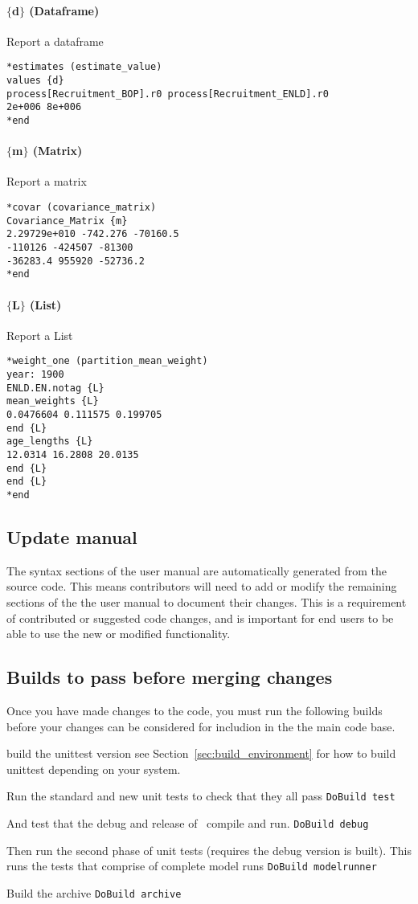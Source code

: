 \paragraph*{$\{$d$\}$ (Dataframe)}
Report a dataframe
{\small{\begin{verbatim}
*estimates (estimate_value)
values {d}
process[Recruitment_BOP].r0 process[Recruitment_ENLD].r0 
2e+006 8e+006
*end
\end{verbatim}}}

\paragraph*{$\{$m$\}$ (Matrix)}
Report a matrix
{\small{\begin{verbatim}
*covar (covariance_matrix)
Covariance_Matrix {m}
2.29729e+010 -742.276 -70160.5
-110126 -424507 -81300 
-36283.4 955920 -52736.2 
*end
\end{verbatim}}}

\paragraph*{$\{$L$\}$ (List)}
Report a List
{\small{\begin{verbatim}
*weight_one (partition_mean_weight)
year: 1900
ENLD.EN.notag {L}
mean_weights {L}
0.0476604 0.111575 0.199705
end {L}
age_lengths {L}
12.0314 16.2808 20.0135
end {L}
end {L}
*end
\end{verbatim}}}

\subsection{Update manual}
The syntax sections of the user manual are automatically generated from the source code. This means contributors will need to add or modify the remaining sections of the the user manual to document their changes. This is a requirement of contributed or suggested code changes, and is important for end users to be able to use the new or modified functionality.

\subsection{Builds to pass before merging changes}

Once you have made changes to the code, you must run the following builds before your changes can be considered for includion in the the main code base.

build the unittest version see Section~\ref{sec:build_environment} for how to build unittest depending on your system.

Run the standard and new unit tests to check that they all pass
\texttt{DoBuild test}

And test that the debug and release of \CNAME\ compile and run.
\texttt{DoBuild debug}

Then run the second phase of unit tests (requires the debug version is built). This runs the tests that comprise of complete model runs
\texttt{DoBuild modelrunner}

Build the archive 
\texttt{DoBuild archive}


